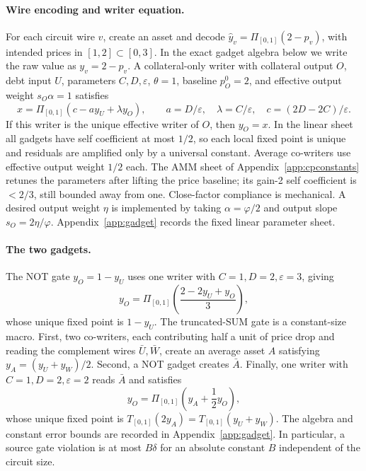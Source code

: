 \documentclass{llncs}
\newcommand{\clip}{\Pi}
\newcommand{\eps}{\varepsilon}
\newcommand{\T}{T_{[0,1]}}
\begin{document}
\paragraph{Wire encoding and writer equation.}
For each circuit wire \(v\), create an asset and decode \(\widehat y_v=\clip_{[0,1]}(2-p_v)\), with intended prices in \([1,2]\subset[0,3]\). In the exact gadget algebra below we write the raw value as \(y_v=2-p_v\). A collateral-only writer with collateral output \(O\), debt input \(U\), parameters \(C,D,\eps\), \(\theta=1\), baseline \(p_O^0=2\), and effective output weight \(s_O\alpha=1\) satisfies
\begin{equation}
 x=\clip_{[0,1]}(c-a y_U+\lambda y_O),
 \qquad
 a=D/\eps,
 \quad \lambda=C/\eps,
 \quad c=(2D-2C)/\eps .
 \label{eq:writer}
\end{equation}
If this writer is the unique effective writer of \(O\), then \(y_O=x\).  In the linear sheet all gadgets have self coefficient at most \(1/2\), so each local fixed point is unique and residuals are amplified only by a universal constant.  Average co-writers use effective output weight \(1/2\) each. The AMM sheet of Appendix~\ref{app:cpconstants} retunes the parameters after lifting the price baseline; its gain-2 self coefficient is \(<2/3\), still bounded away from one.  Close-factor compliance is mechanical. A desired output weight \(\eta\) is implemented by taking \(\alpha=\varphi/2\) and output slope \(s_O=2\eta/\varphi\). Appendix~\ref{app:gadget} records the fixed linear parameter sheet.

\paragraph{The two gadgets.}
The NOT gate \(y_O=1-y_U\) uses one writer with \(C=1,D=2,\eps=3\), giving
\[
 y_O=\clip_{[0,1]}\left(\frac{2-2y_U+y_O}{3}\right),
\]
whose unique fixed point is \(1-y_U\).  The truncated-SUM gate is a constant-size macro.  First, two co-writers, each contributing half a unit of price drop and reading the complement wires \(\bar U,\bar W\), create an average asset \(A\) satisfying \(y_A=(y_U+y_W)/2\).  Second, a NOT gadget creates \(\bar A\).  Finally, one writer with \(C=1,D=2,\eps=2\) reads \(\bar A\) and satisfies
\[
 y_O=\clip_{[0,1]}\left(y_A+\frac{1}{2}y_O\right),
\]
whose unique fixed point is \(\T(2y_A)=\T(y_U+y_W)\).  The algebra and constant error bounds are recorded in Appendix~\ref{app:gadget}.  In particular, a source gate violation is at most \(B\delta\) for an absolute constant \(B\) independent of the circuit size.
\end{document}
